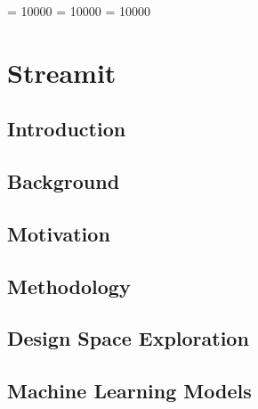 %
%
%
%
%
%
%

\newcommand{\ie}{i.\,e.\xspace}
\newcommand{\eg}{e.\,g.\xspace}
\newcommand{\bench}[1]{\textit{#1}\xspace}
\clubpenalty = 10000
\widowpenalty = 10000
\displaywidowpenalty = 10000
\chapter{Streamit}

\section{Introduction}
\label{sec:intro}


\section{Background}
\label{sec:background}


\section{Motivation}
\label{sec:motiviation}


\section{Methodology}
\label{sec:setup}


\section{Design Space Exploration}
\label{sec:dse}


\section{Machine Learning Models}
\label{sec:ml}



